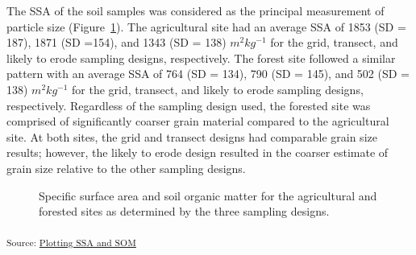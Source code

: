 \documentclass[
  number]{elsarticle}
\begin{document}
The SSA of the soil samples was considered as the principal measurement
of particle size (Figure~\ref{fig-ssasom-plot}). The agricultural site
had an average SSA of 1853 (SD = 187), 1871 (SD =154), and 1343 (SD =
138) \(m^2 kg^{-1}\) for the grid, transect, and likely to erode
sampling designs, respectively. The forest site followed a similar
pattern with an average SSA of 764 (SD = 134), 790 (SD = 145), and 502
(SD = 138) \(m^2 kg^{-1}\) for the grid, transect, and likely to erode
sampling designs, respectively. Regardless of the sampling design used,
the forested site was comprised of significantly coarser grain material
compared to the agricultural site. At both sites, the grid and transect
designs had comparable grain size results; however, the likely to erode
design resulted in the coarser estimate of grain size relative to the
other sampling designs.

\begin{figure}[H]


\caption{\label{fig-ssasom-plot}Specific surface area and soil organic
matter for the agricultural and forested sites as determined by the
three sampling designs.}

\end{figure}%

\textsubscript{Source:
\href{https://alex-koiter.github.io/sampling-design-manuscript/notebooks/PSA_OM-preview.html\#cell-fig-ssasom-plot}{Plotting
SSA and SOM}}
\end{document}

